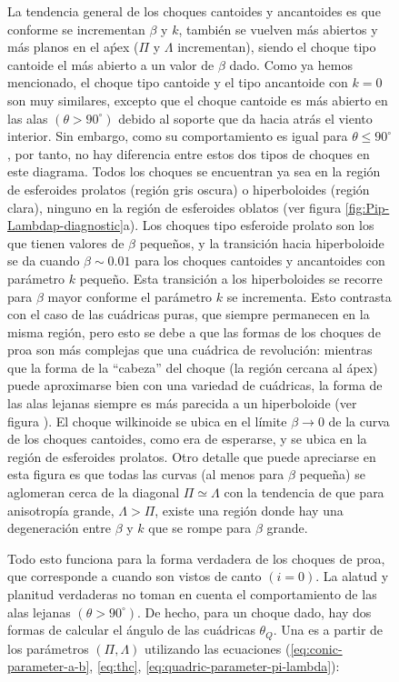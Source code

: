 \begin{figure}
La tendencia general de los choques cantoides y ancantoides es que conforme se incrementan $\beta$ y $k$, también se vuelven más abiertos y más planos en el aṕex ($\Pi$ y $\Lambda$ incrementan), siendo el choque tipo cantoide el más abierto a un valor de $\beta$ dado. Como ya hemos mencionado, el choque tipo cantoide y el tipo ancantoide con $k=0$ son muy similares, excepto que el choque cantoide es más abierto en las alas $(\theta > 90^\circ)$ debido al soporte que da hacia atrás el viento interior. Sin embargo, como su comportamiento es igual para $\theta \leq 90^\circ$, por tanto, no hay diferencia entre estos dos tipos de choques en este diagrama. Todos los choques se encuentran ya sea en la región de esferoides prolatos (región gris oscura) o hiperboloides (región clara), ninguno en la región de esferoides oblatos (ver figura \ref{fig:Pip-Lambdap-diagnostic}a). Los choques tipo esferoide prolato son los que tienen valores de $\beta$ pequeños, y la transición hacia hiperboloide se da cuando $\beta \sim 0.01$ para los choques cantoides y ancantoides con parámetro $k$ pequeño. Esta transición a los hiperboloides se recorre para $\beta$ mayor conforme el parámetro $k$ se incrementa. Esto contrasta con el caso de las cuádricas puras, que siempre permanecen en la misma región, pero esto se debe a que las formas de los choques de proa son más complejas que una cuádrica de revolución: mientras que la forma de la ``cabeza'' del choque (la región cercana al ápex) puede aproximarse bien con una variedad de cuádricas, la forma de las alas lejanas siempre es más parecida a un hiperboloide (ver figura ). El choque wilkinoide se ubica en el límite $\beta\to 0$ de la curva de los choques cantoides, como era de esperarse, y se ubica en la región de esferoides prolatos. Otro detalle que puede apreciarse en esta figura es que todas las curvas (al menos para $\beta$ pequeña) se aglomeran cerca de la diagonal $\Pi \simeq \Lambda$ con la tendencia de que para anisotropía grande, $\Lambda > \Pi$, existe una región donde hay una degeneración entre $\beta$ y $k$ que se rompe para $\beta$ grande.

Todo esto funciona para la forma verdadera de los choques de proa, que corresponde a cuando son vistos de canto $(i=0)$. La alatud y planitud verdaderas no toman en cuenta el comportamiento de las alas lejanas $(\theta > 90^\circ)$. De hecho, para un choque dado, hay dos formas de calcular el ángulo de las cuádricas $\theta_Q$. Una es a partir de los parámetros $(\Pi, \Lambda)$ utilizando las ecuaciones (\ref{eq:conic-parameter-a-b}, \ref{eq:thc}, \ref{eq:quadric-parameter-pi-lambda}):


\end{figure}
